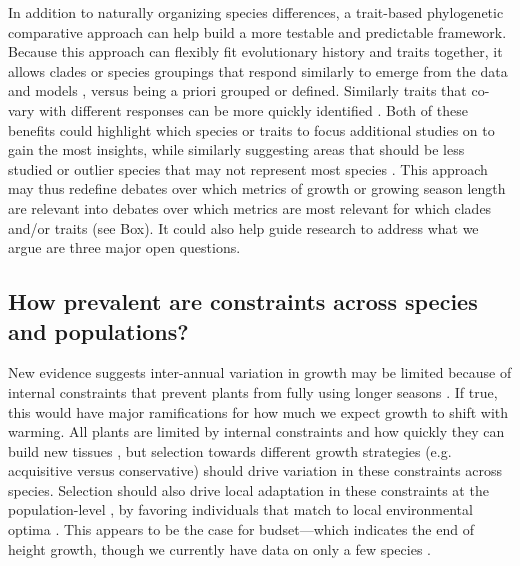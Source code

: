 \documentclass[11pt]{article}
\begin{document}
In addition to naturally organizing species differences, a trait-based phylogenetic comparative approach can help build a more testable and predictable framework. %
Because this approach can flexibly fit evolutionary history and traits together, it allows clades or species groupings that respond similarly to emerge from the data and models \citep{davies2019phylogenetically}, versus being a priori grouped or defined. Similarly traits that co-vary with different responses can be more quickly identified \citep[e.g.][see Fig. \ref{fig:phylomodel}]{willis2008phylogenetic,davies2019phylogenetically}. Both of these benefits could highlight which species or traits to focus additional studies on to gain the most insights, while similarly suggesting areas that should be less studied \citep[e.g. traits that may be too confounded with evolutionary history,][]{cornwell2014functional,westoby2023phylogenetically} or outlier species that may not represent most species \citep{morales2024phylogenetic}. This approach may thus redefine debates over which metrics of growth or growing season length are relevant into debates over which metrics are most relevant for which clades and/or traits (see Box). It could also help guide research to address what we argue are three major open questions.


\subsection*{How prevalent are constraints across species and populations?} %

New evidence suggests inter-annual variation in growth may be limited because of internal constraints that prevent plants from fully using longer seasons \citep{zohner2023effect}. If true, this would have major ramifications for how much we expect growth to shift with warming. All plants are limited by internal constraints and how quickly they can build new tissues \citep{marchand2021timing,luo2024internal}, but selection towards different growth strategies (e.g. acquisitive versus conservative) should drive variation in these constraints across species. Selection should also drive local adaptation in these constraints at the population-level \citep{mckown2016impacts,soolanayakanahally2013timing}, by favoring individuals that match to local environmental optima \citep{Colautti:2010,mckown2014np}. This appears to be the case for budset---which indicates the end of height growth, though we currently have data on only a few species \citep{aitken2016,zeng2024weak}. 
\end{document}
